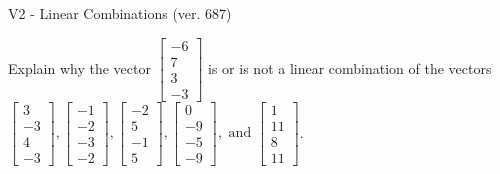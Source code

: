 \begin{exercise}
  \begin{exerciseTitle}V2 - Linear Combinations (ver. 687)\end{exerciseTitle}
  \begin{exerciseStatement}
    Explain why the vector \(\left[\begin{array}{c}
-6 \\
7 \\
3 \\
-3
\end{array}\right]\)  is or is not a linear 
	combination of the vectors \(\left[\begin{array}{c}
3 \\
-3 \\
4 \\
-3
\end{array}\right] , \left[\begin{array}{c}
-1 \\
-2 \\
-3 \\
-2
\end{array}\right] , \left[\begin{array}{c}
-2 \\
5 \\
-1 \\
5
\end{array}\right] , \left[\begin{array}{c}
0 \\
-9 \\
-5 \\
-9
\end{array}\right] , \text{ and } \left[\begin{array}{c}
1 \\
11 \\
8 \\
11
\end{array}\right]\).
	



\end{exerciseStatement}
\end{exercise}
